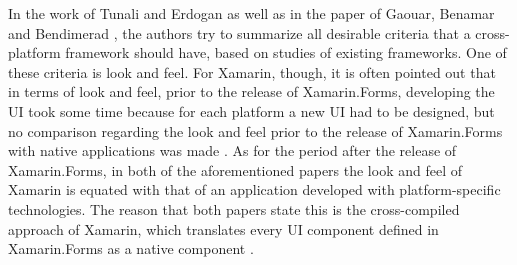 \documentclass[Bachelor,BIF,english]{twbook}
\begin{document}
In the work of Tunali and Erdogan \cite{tunali2015comparison} as well as in the paper of Gaouar, Benamar and Bendimerad \cite{GaouarBenamarBendimerad2016}, the authors try to summarize all desirable criteria that a cross-platform framework should have, based on studies of existing frameworks. One of these criteria is look and feel. For Xamarin, though, it is often pointed out that in terms of look and feel, prior to the release of Xamarin.Forms, developing the UI took some time because for each platform a new UI had to be designed, but no comparison regarding the look and feel prior to the release of Xamarin.Forms with native applications was made \cite[p.~20]{GaouarBenamarBendimerad2016} \cite[p.~5]{tunali2015comparison}. As for the period after the release of Xamarin.Forms, in both of the aforementioned papers the look and feel of Xamarin is equated with that of an application developed with platform-specific technologies. The reason that both papers state this is the cross-compiled approach of Xamarin, which translates every UI component defined in Xamarin.Forms as a native component  \cite[p.~21]{GaouarBenamarBendimerad2016} \cite[p.~5,~8]{tunali2015comparison}.

\newpage
\end{document}

